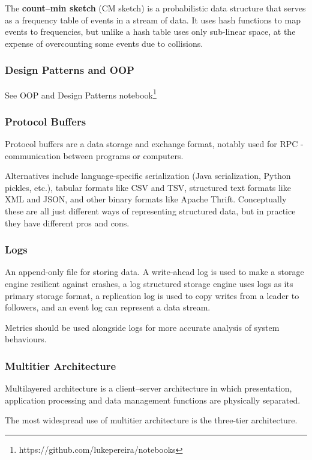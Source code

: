 \documentclass{article}
\begin{document}
    
    The \textbf{count–min sketch} (CM sketch) is a probabilistic data structure that serves as a frequency table of events in a stream of data. It uses hash functions to map events to frequencies, but unlike a hash table uses only sub-linear space, at the expense of overcounting some events due to collisions.
    
    \subsubsection{Design Patterns and OOP}
    See OOP and Design Patterns notebook\footnote{https://github.com/lukepereira/notebooks}
    
    \subsubsection{Protocol Buffers}
    Protocol buffers are a data storage and exchange format, notably used for RPC - communication between programs or computers.
    
    Alternatives include language-specific serialization (Java serialization, Python pickles, etc.), tabular formats like CSV and TSV, structured text formats like XML and JSON, and other binary formats like Apache Thrift. Conceptually these are all just different ways of representing structured data, but in practice they have different pros and cons.

    
    \subsubsection{Logs}
    An append-only file for storing data. A write-ahead log is used to make a storage engine resilient against crashes, a log structured storage engine uses logs as its primary storage format, a replication log is used to copy writes from a leader to followers, and an event log can represent a data stream.
    
    Metrics should be used alongside logs for more accurate analysis of system behaviours.

    \subsubsection{Multitier Architecture}
     Multilayered architecture is a client–server architecture in which presentation, application processing and data management functions are physically separated. 
    
    The most widespread use of multitier architecture is the three-tier architecture.
\end{document}
